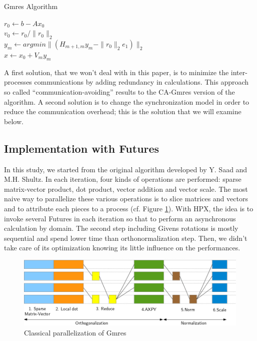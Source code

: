 \documentclass[smallextended]{svjour3}
\begin{document}
\begin{algorithm}
\caption{Gmres Algorithm}
$r_0 \gets b-Ax_0$\\  
$v_0 \gets r_0/\|r_0\|_2$\\ 
  $y_m \gets argmin\|(H_{m+1,m}y_m - \|r_0\|_2e_1)\|_2$\\
  $x \gets x_0 + V_my_m$
\end{algorithm}

A first solution, that we won't deal with in this paper, is to minimize the inter-processes communications by adding redundancy in calculations. This approach so called \enquote{communication-avoiding} \cite{CAGmres} results to the CA-Gmres version of the algorithm. A second solution is to change the synchronization model in order to reduce the communication overhead; this is the solution that we will examine below.

\subsection{Implementation with Futures}
In this study, we started from the original algorithm \cite{GMRES} developed by Y. Saad and M.H. Shultz. In each iteration, four kinds of operations are performed: sparse matrix-vector product, dot product, vector addition and vector scale. The most naive way to parallelize these various operations is to slice matrices and vectors and to attribute each pieces to a process (cf. Figure \ref{pargmres}). With HPX, the idea is to invoke several Futures in each iteration so that to perform an asynchronous calculation by domain. The second step including Givens rotations is mostly sequential and spend lower time than orthonormalization step. Then, we didn't take care of its optimization knowing its little influence on the performances.

\begin{figure}[h]
\begin{center}
\includegraphics[scale=0.5]{Images/Im6.png}
\end{center}
\caption{Classical parallelization of Gmres}
\label{pargmres}
\end{figure}
\end{document}
